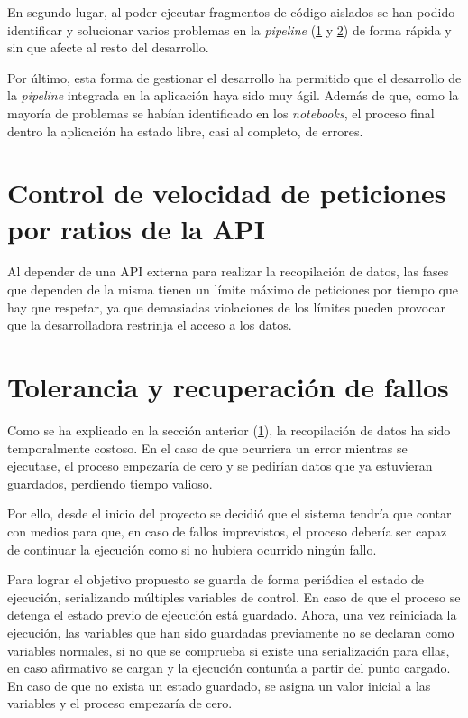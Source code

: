En segundo lugar, al poder ejecutar fragmentos de código aislados se han podido identificar y solucionar varios problemas en la \textit{pipeline} (\ref{sec:rate-limit} y \ref{sec:fault-tolerance}) de forma rápida y sin que afecte al resto del desarrollo.

Por último, esta forma de gestionar el desarrollo ha permitido que el desarrollo de la \textit{pipeline} integrada en la aplicación haya sido muy ágil. Además de que, como la mayoría de problemas se habían identificado en los \textit{notebooks}, el proceso final dentro la aplicación ha estado libre, casi al completo, de errores.

\section{Control de velocidad de peticiones por ratios de la API}\label{sec:rate-limit}
Al depender de una API externa para realizar la recopilación de datos, las fases que dependen de la misma tienen un límite máximo de peticiones por tiempo que hay que respetar, ya que demasiadas violaciones de los límites pueden provocar que la desarrolladora restrinja el acceso a los datos.



\section{Tolerancia y recuperación de fallos}\label{sec:fault-tolerance}
Como se ha explicado en la sección anterior (\ref{sec:rate-limit}), la recopilación de datos ha sido temporalmente costoso. En el caso de que ocurriera un error mientras se ejecutase, el proceso empezaría de cero y se pedirían datos que ya estuvieran guardados, perdiendo tiempo valioso.

Por ello, desde el inicio del proyecto se decidió que el sistema tendría que contar con medios para que, en caso de fallos imprevistos, el proceso debería ser capaz de continuar la ejecución como si no hubiera ocurrido ningún fallo.

Para lograr el objetivo propuesto se guarda de forma periódica el estado de ejecución, serializando múltiples variables de control. En caso de que el proceso se detenga el estado previo de ejecución está guardado. Ahora, una vez reiniciada la ejecución, las variables que han sido guardadas previamente no se declaran como variables normales, si no que se comprueba si existe una serialización para ellas, en caso afirmativo se cargan y la ejecución contunúa a partir del punto cargado. En caso de que no exista un estado guardado, se asigna un valor inicial a las variables y el proceso empezaría de cero.


